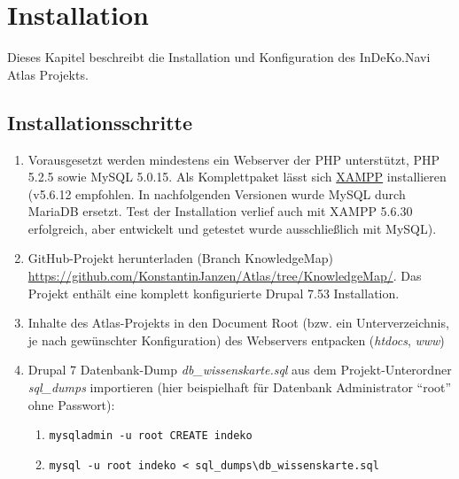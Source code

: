 \tableofcontents

\newpage
\listoffigures
\thispagestyle{empty}


\newpage
\restoregeometry
{}




\section{Installation}
Dieses Kapitel beschreibt die Installation und Konfiguration des InDeKo.Navi Atlas Projekts.


\subsection{Installationsschritte}
\begin{enumerate}
	\item Vorausgesetzt werden mindestens ein Webserver der PHP unterstützt, PHP 5.2.5 sowie MySQL 5.0.15. Als Komplettpaket lässt sich \zB \href{https://www.apachefriends.org/de/download.html}{XAMPP} installieren (v5.6.12 empfohlen. In nachfolgenden Versionen wurde MySQL durch MariaDB ersetzt. Test der Installation verlief auch mit XAMPP 5.6.30 erfolgreich, aber entwickelt und getestet wurde ausschließlich mit MySQL).

	\item GitHub-Projekt herunterladen (Branch KnowledgeMap) \url{https://github.com/KonstantinJanzen/Atlas/tree/KnowledgeMap/}.
	Das Projekt enthält eine komplett konfigurierte Drupal 7.53 Installation.

	\item Inhalte des Atlas-Projekts in den Document Root (bzw. ein Unterverzeichnis, je nach gewünschter Konfiguration) des Webservers entpacken (\zB \textit{htdocs}, \textit{www})

	\item Drupal 7 Datenbank-Dump \textit{db\_wissenskarte.sql} aus dem Projekt-Unterordner \textit{sql\_dumps} importieren (hier beispielhaft für Datenbank Administrator \enquote{root} ohne Passwort):
	\begin{enumerate}
		\item \lstinline|mysqladmin -u root CREATE indeko|

		\item \lstinline|mysql -u root indeko < sql_dumps\db_wissenskarte.sql|
	\end{enumerate}


\end{enumerate}
